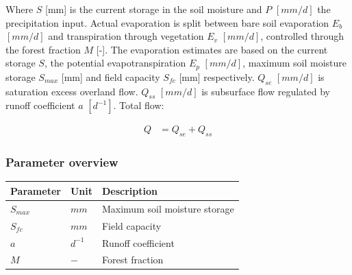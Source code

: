 Where $S$ [mm] is the current storage in the soil moisture and $P$ $[mm/d]$ the precipitation input. 
Actual evaporation is split between bare soil evaporation $E_b$ $[mm/d]$ and transpiration through vegetation $E_v$ $[mm/d]$, controlled through the forest fraction $M$ [-]. 
The evaporation estimates are based on the current storage $S$, the potential evapotranspiration $E_p$ $[mm/d]$, maximum soil moisture storage $S_{max}$ [mm] and field capacity $S_{fc}$ [mm] respectively. 
$Q_{se}$ $[mm/d]$ is saturation excess overland flow.  $Q_{ss}$ $[mm/d]$ is subsurface flow regulated by runoff coefficient $a$ $[d^{-1}]$.
Total flow:

\begin{align}
	Q &= Q_{se}+Q_{ss}
\end{align}

\newpage
\subsubsection{Parameter overview}
\begin{table}[htbp]
  \centering
    \begin{tabular}{lll}
    \toprule
    Parameter & Unit  & Description \\
    \midrule
    $S_{max}$ & $mm$  & Maximum soil moisture storage \\
    $S_{fc}$ & $mm$  & Field capacity \\
    $a$   & $d^{-1}$ & Runoff coefficient \\
    $M$   & $-$   & Forest fraction \\
    \bottomrule
    \end{tabular}%
  \label{tab:addlabel}%
\end{table}%
